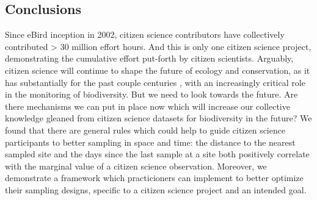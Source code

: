 \documentclass[9pt,twocolumn,twoside,lineno]{pnas-new}
\begin{document}
\subsection*{Conclusions}
Since eBird inception in 2002, citizen science contributors have collectively contributed > 30 million effort hours. And this is only one citizen science project, demonstrating the cumulative effort put-forth by citizen scientists. Arguably, citizen science will continue to shape the future of ecology and conservation, as it has substantially for the past couple centuries \cite{silvertown2009new}, with an increasingly critical role \cite{mckinley2017citizen, pocock2018vision} in the monitoring of biodiversity. But we need to look towards the future. Are there mechanisms we can put in place now which will increase our collective knowledge gleaned from citizen science datasets for biodiversity in the future? We found that there are general rules which could help to guide citizen science participants to better sampling in space and time: the distance to the nearest sampled site and the days since the last sample at a site both positively correlate with the marginal value of a citizen science observation. Moreover, we demonstrate a framework which practicioners can implement to better optimize their sampling designs, specific to a citizen science project and an intended goal.
\end{document}
